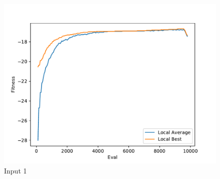 \documentclass{standalone}
\begin{document}
\begin{figure}[!htb]
	\caption{Input 1}
	\label{fig:graph_1012}
	\includegraphics[width=\textwidth]{../graphs/graphs/1012.pdf}
\end{figure}
\end{document}
